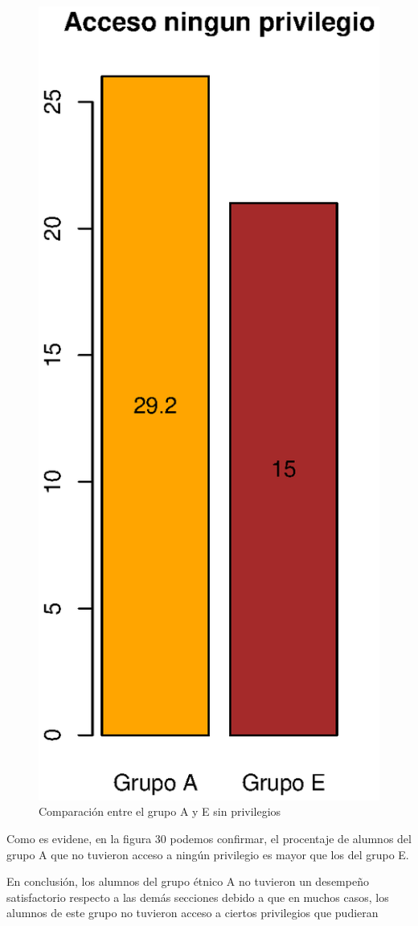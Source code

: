 \documentclass{article}
\begin{document}
    \begin{figure}[H]
        \centering
        \includegraphics[scale = 0.5]{Output/Plots/sinprivilegio.eps}
        \vspace*{-6mm}
        \caption{Comparaci\'on entre el grupo A y E sin privilegios}
    \end{figure}

    Como es evidene, en la figura 30 podemos confirmar, el procentaje de alumnos del grupo A que no 
    tuvieron acceso a ning\'un privilegio es mayor que los del grupo E.

    En conclusi\'on, los alumnos del grupo \'etnico A no tuvieron un desempe\~no satisfactorio
    respecto a las dem\'as secciones debido a que en muchos casos, los alumnos de este grupo
    no tuvieron acceso a ciertos privilegios que pudieran 
\end{document}

